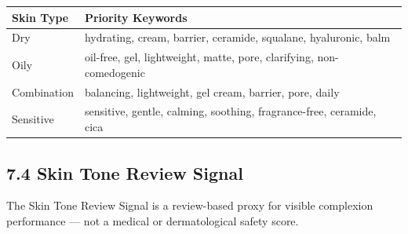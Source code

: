 \documentclass[
  letterpaper,
  DIV=11,
  numbers=noendperiod]{scrartcl}
\newcounter{none} %
\begin{document}
{\def\LTcaptype{none} %
\begin{longtable}[]{@{}
  >{\raggedright\arraybackslash}p{}
  >{\raggedright\arraybackslash}p{}@{}}
\toprule\noalign{}
\begin{minipage}[b]{\linewidth}\raggedright
Skin Type
\end{minipage} & \begin{minipage}[b]{\linewidth}\raggedright
Priority Keywords
\end{minipage} \\
\midrule\noalign{}
\endhead
\bottomrule\noalign{}
\endlastfoot
Dry & hydrating, cream, barrier, ceramide, squalane, hyaluronic, balm \\
Oily & oil-free, gel, lightweight, matte, pore, clarifying,
non-comedogenic \\
Combination & balancing, lightweight, gel cream, barrier, pore, daily \\
Sensitive & sensitive, gentle, calming, soothing, fragrance-free,
ceramide, cica \\
\end{longtable}
}

\subsection{7.4 Skin Tone Review Signal}\label{skin-tone-review-signal}

The Skin Tone Review Signal is a review-based proxy for visible
complexion performance --- not a medical or dermatological safety score.
\end{document}
